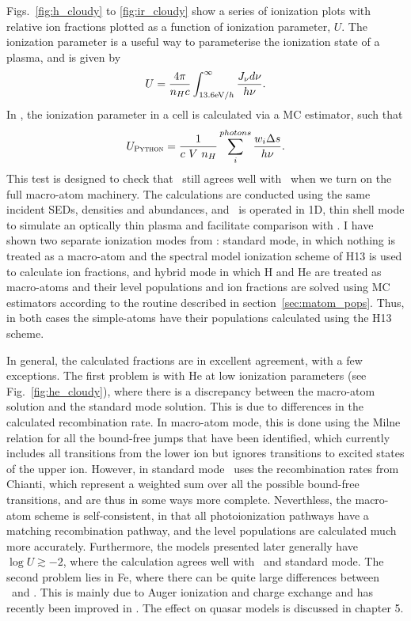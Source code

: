 Figs.~\ref{fig:h_cloudy} to \ref{fig:ir_cloudy} show a series of 
ionization plots with relative ion fractions plotted as a function of
ionization parameter, $U$. The ionization parameter is a useful
way to parameterise the ionization state of a plasma, and is given by
\begin{equation}
U = \frac{4\pi}{n_H c}\int_{13.6{\rm{eV}} / h}^{\infty}\frac{{J_{\nu}d\nu}}{h\nu}.
\label{eq:ip}
\end{equation}
In \py, the ionization parameter in a cell
is calculated via a MC estimator, such that
\begin{equation}
U_{\textsc{Python}} = \frac{1}{c~V~n_H} \sum_i^{photons} \frac{w_i \Delta s}{h \nu}.
\end{equation}
This test is designed to check that \py\ still agrees
well with \cld\ when we turn on the full macro-atom machinery.
The calculations are conducted using the same 
incident SEDs, densities and abundances, and \py\ is operated in
1D, thin shell mode to simulate an optically thin plasma and facilitate
comparison with \cld. I have shown two separate ionization modes
from \py: standard mode, in which nothing is treated as a macro-atom
and the spectral model ionization scheme of H13 is used to calculate
ion fractions, and hybrid mode in which H and He are treated as 
macro-atoms and their level populations and ion fractions are solved
using MC estimators according to the routine
described in section~\ref{sec:matom_pops}. Thus, in both 
cases the simple-atoms have their populations calculated using the H13 scheme.

In general, the calculated fractions are in excellent agreement, with a few 
exceptions. The first problem is with He at low ionization parameters 
(see Fig.~\ref{fig:he_cloudy}), where there is a discrepancy between 
the macro-atom solution and the standard mode solution. This is due to 
differences in the calculated recombination rate. In macro-atom mode, 
this is done using the Milne relation for all the bound-free jumps that 
have been identified, which currently includes all transitions from the lower ion but
ignores transitions to excited states of the upper ion. However, 
in standard mode \py\ uses the recombination rates from Chianti,
which represent a weighted sum over all the possible bound-free transitions,
and are thus in some ways more complete. Neverthless, the macro-atom
scheme is self-consistent, in that all photoionization pathways have a matching 
recombination pathway, and the level populations are calculated much more
accurately. Furthermore, the models presented later generally have 
$\log U \gtrsim -2$, where the calculation
agrees well with \cld\ and standard mode.
The second problem lies in Fe, where there can be quite large differences
between \py\ and \cld. This is mainly due to Auger ionization and charge 
exchange and has recently been improved in \py. 
The effect on quasar models is discussed in chapter 5. 


